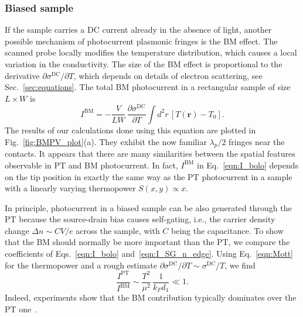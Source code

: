 \documentclass[aps, prb, reprint, superscriptaddress]{revtex4-2}
\begin{document}
\subsubsection{Biased sample}
\label{sssec:biased}
If the sample carries a DC current already in the absence of light,
another possible mechanism of photocurrent plasmonic fringes is the BM effect.
The scanned probe locally modifies the temperature distribution, which causes a local variation in the conductivity.  
The size of the BM effect is proportional to the derivative ${\partial\sigma^\mathrm{DC}} / {\partial T}$,
which depends on details of electron scattering,
see Sec.~\ref{sec:equations}.
The total BM photocurrent in a rectangular sample of size $L \times W$
is
\begin{equation}
I^\mathrm{BM} = -\frac{V}{L W}\, \frac{\partial \sigma^\mathrm{DC}}{\partial T}
\int\limits d^2 r  \, [T(\mathbf{r}) - T_0].
\label{eqn:I_bolo}
\end{equation}
The results of our calculations done using this equation are plotted in Fig.~\ref{fig:BMPV_plot}(a).
They exhibit the now familiar ${\lambda_p} / {2}$ fringes near the contacts. 
It appears that there are many similarities between the spatial features observable in PT and BM photocurrent. 
In fact, $I^\mathrm{BM}$ in Eq.~\eqref{eqn:I_bolo} depends on the tip position
in exactly the same way as the PT photocurrent in a sample with a linearly varying thermopower $S(x, y) \propto x$. 
%
%

In principle, photocurrent in a biased sample can be also generated through the PT because the source-drain bias causes self-gating,
i.e., the carrier density change $\Delta n \sim C V / e$ across the sample, with $C$ being the capacitance. 
To show that the BM should normally be more important than the PT, we compare the coefficients of Eqs.~\eqref{eqn:I_bolo} and~\eqref{eqn:I_SG_n_edge}. 
Using Eq.~\eqref{eqn:Mott} for the thermopower and a rough estimate ${\partial\sigma^\mathrm{DC}} / {\partial T} \sim {\sigma^\mathrm{DC}} / {T}$,
we find
\begin{equation}
\label{eqn:Ibol_Ipte}
\frac{I^\mathrm{PT}}{I^\mathrm{BM}} \sim \frac{T^2}{\mu^2}\, \frac{1}{k_F d_1} \ll 1.
\end{equation}
Indeed, experiments show that the BM contribution typically dominates over the PT one~\cite{Freitag_2012}.
\end{document}
